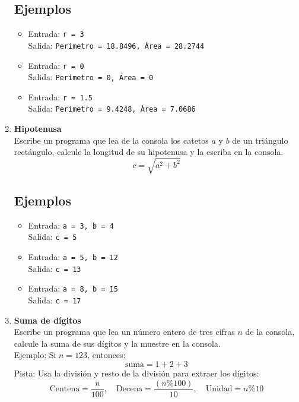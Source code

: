 \begin{enumerate}
    \subsection*{Ejemplos}
    \begin{itemize}
        \item Entrada: \texttt{r = 3}\\
              Salida: \texttt{Perímetro = 18.8496, Área = 28.2744}
        \item Entrada: \texttt{r = 0}\\
              Salida: \texttt{Perímetro = 0, Área = 0}
        \item Entrada: \texttt{r = 1.5}\\
              Salida: \texttt{Perímetro = 9.4248, Área = 7.0686}
    \end{itemize}

    \item \textbf{Hipotenusa}\\
    Escribe un programa que lea de la consola los catetos \(a\) y \(b\) de un triángulo rectángulo, calcule la longitud de su hipotenusa y la escriba en la consola.\\
    \[
    c = \sqrt{a^2 + b^2}
    \]
    \subsection*{Ejemplos}
    \begin{itemize}
        \item Entrada: \texttt{a = 3, b = 4}\\
              Salida: \texttt{c = 5}
        \item Entrada: \texttt{a = 5, b = 12}\\
              Salida: \texttt{c = 13}
        \item Entrada: \texttt{a = 8, b = 15}\\
              Salida: \texttt{c = 17}
    \end{itemize}

    \item \textbf{Suma de dígitos}\\
    Escribe un programa que lea un número entero de tres cifras \(n\) de la consola, calcule la suma de sus dígitos y la muestre en la consola.\\
    Ejemplo: Si \(n = 123\), entonces:
    \[
    \text{suma} = 1 + 2 + 3
    \]
    Pista: Usa la división y resto de la división para extraer los dígitos:
    \[
    \text{Centena} = \frac{n}{100}, \quad \text{Decena} = \frac{(n \% 100)}{10}, \quad \text{Unidad} = n \% 10
    \]

\end{enumerate}
